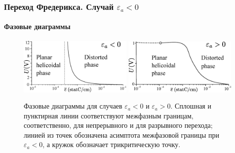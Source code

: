 \documentclass[utf8,secheader]{beamer}
\begin{document}
\begin{frame}
\frametitle{Переход Фредерикса. Случай $\varepsilon_a < 0$}
\framesubtitle{Фазовые диаграммы}
\begin{figure}[h]
\includegraphics[width=0.49\textwidth]{1aa.eps}%
\includegraphics[width=0.49\textwidth]{1bb.eps}%
\caption{Фазовые диаграммы для случаев $\varepsilon_a < 0$ и $\varepsilon_a > 0$. Сплошная и пунктирная линии соответствуют межфазным границам, соответственно, для непрерывного и для разрывного перехода; линией из точек обозначена асимптота  межфазовой границы при $\varepsilon_a < 0$, а кружок обозначает трикритическую точку.}
\end{figure}
\end{frame}
\end{document}
